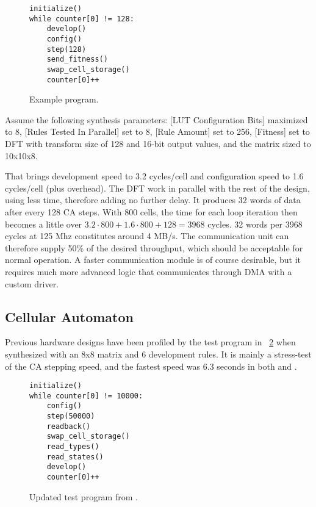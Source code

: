 \begin{figure}[!ht]
\begin{lstlisting}[xleftmargin=0.35\textwidth]
initialize()
while counter[0] != 128:
    develop()
    config()
    step(128)
    send_fitness()
    swap_cell_storage()
    counter[0]++
\end{lstlisting}
\caption[Example program] {
    Example program.
}
\label{fig:example-program}
\end{figure}

Assume the following synthesis parameters:
[LUT Configuration Bits] maximized to 8,
[Rules Tested In Parallel] set to 8,
[Rule Amount] set to 256,
[Fitness] set to DFT with transform size of 128 and 16-bit output values,
and the matrix sized to 10x10x8.

That brings development speed to 3.2 cycles/cell and configuration speed to 1.6 cycles/cell (plus overhead)\footnotemark.
The DFT work in parallel with the rest of the design, using less time, therefore adding no further delay.
It produces 32 words of data after every 128 CA steps.
With 800 cells, the time for each loop iteration then becomes a little over $3.2 \cdot 800 + 1.6 \cdot 800 + 128 = 3968$ cycles.
32 words per 3968 cycles at 125 Mhz constitutes around 4 MB/s.
The communication unit can therefore supply 50\% of the desired throughput, which should be acceptable for normal operation.
A faster communication module is of course desirable, but it requires much more advanced logic that communicates through DMA with a custom driver.


\subsection{Cellular Automaton}

Previous hardware designs have been profiled by the test program in \figurename~\ref{fig:test-program} when synthesized with an 8x8 matrix and 6 development rules.
It is mainly a stress-test of the CA stepping speed, and the fastest speed was 6.3 seconds in both \cite{djupdal2003sblock} and \cite{stovneng2014sblock}.

\begin{figure}[!ht]
\begin{lstlisting}[xleftmargin=0.34\textwidth]
initialize()
while counter[0] != 10000:
    config()
    step(50000)
    readback()
    swap_cell_storage()
    read_types()
    read_states()
    develop()
    counter[0]++
\end{lstlisting}
\caption[Test program] {
    Updated test program from \cite{djupdal2003sblock}.
}
\label{fig:test-program}
\end{figure}


